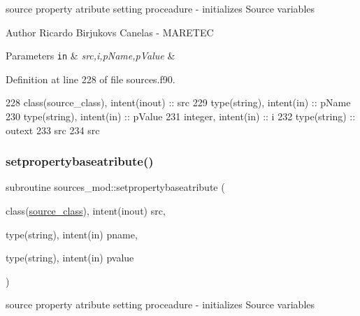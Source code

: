 source property atribute setting proceadure -\/ initializes Source variables 

\begin{DoxyAuthor}{Author}
Ricardo Birjukovs Canelas -\/ M\+A\+R\+E\+T\+EC 
\end{DoxyAuthor}

\begin{DoxyParams}[1]{Parameters}
\mbox{\tt in}  & {\em src,i,p\+Name,p\+Value} & \\
\hline
\end{DoxyParams}


Definition at line 228 of file sources.\+f90.


\begin{DoxyCode}
228     \textcolor{keywordtype}{class}(source\_class), \textcolor{keywordtype}{intent(inout)} :: src
229     \textcolor{keywordtype}{type}(string), \textcolor{keywordtype}{intent(in)} :: pName
230     \textcolor{keywordtype}{type}(string), \textcolor{keywordtype}{intent(in)} :: pValue
231     \textcolor{keywordtype}{integer}, \textcolor{keywordtype}{intent(in)} :: i
232     \textcolor{keywordtype}{type}(string) :: outext
233     src%
234     src%
\end{DoxyCode}
\mbox{\label{namespacesources__mod_ac486d29030348958c06dfebd8ddc0d5e}} 
\subsubsection{\texorpdfstring{setpropertybaseatribute()}{setpropertybaseatribute()}}
{\footnotesize\ttfamily subroutine sources\+\_\+mod\+::setpropertybaseatribute (\begin{DoxyParamCaption}\item[{class(\mbox{\hyperlink{structsources__mod_1_1source__class}{source\+\_\+class}}), intent(inout)}]{src,  }\item[{type(string), intent(in)}]{pname,  }\item[{type(string), intent(in)}]{pvalue }\end{DoxyParamCaption})\hspace{0.3cm}{\ttfamily [private]}}



source property atribute setting proceadure -\/ initializes Source variables 

